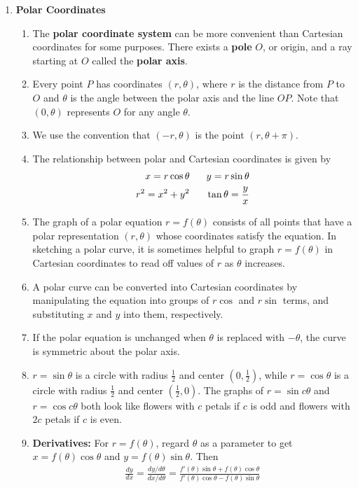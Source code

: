 \documentclass[10pt]{article}
\begin{document}
\begin{multicols}{2}
\begin{enumerate}
    \item \textbf{Polar Coordinates}
    \begin{enumerate}
        \item The \textbf{polar coordinate system} can be more convenient than Cartesian coordinates for some purposes. There exists a \textbf{pole} $O$, or origin, and a ray starting at $O$ called the \textbf{polar axis}. 
        \item Every point $P$ has coordinates $(r, \theta)$, where $r$ is the distance from $P$ to $O$ and $\theta$ is the angle between the polar axis and the line $OP$. Note that $(0, \theta)$ represents $O$ for any angle $\theta$. 
        \item We use the convention that $(-r, \theta)$ is the point $(r, \theta + \pi)$.
        \item The relationship between polar and Cartesian coordinates is given by
        \begin{align*}
            x = r \cos{\theta} \hspace{6mm} y = r \sin{\theta} \\
            r^2 = x^2 + y^2 \hspace{6mm} \tan{\theta} = \frac{y}{x}
        \end{align*}
        \item The graph of a polar equation $r = f(\theta)$ consists of all points that have a polar representation $(r, \theta)$ whose coordinates satisfy the equation. In sketching a polar curve, it is sometimes helpful to graph $r=f(\theta)$ in Cartesian coordinates to read off values of $r$ as $\theta$ increases.
        \item A polar curve can be converted into Cartesian coordinates by manipulating the equation into groups of $r\cos{}$ and $r\sin{}$ terms, and substituting $x$ and $y$ into them, respectively.
        \item If the polar equation is unchanged when $\theta$ is replaced with $-\theta$, the curve is symmetric about the polar axis.
        \item $r=\sin{\theta}$ is a circle with radius $\frac{1}{2}$ and center $(0,\frac{1}{2})$, while $r=\cos{\theta}$ is a circle with radius $\frac{1}{2}$ and center $(\frac{1}{2},0)$. The graphs of $r=\sin{c\theta}$ and $r=\cos{c\theta}$ both look like flowers with $c$ petals if $c$ is odd and flowers with $2c$ petals if $c$ is even.
        \item \textbf{Derivatives:} For $r=f(\theta)$, regard $\theta$ as a parameter to get $x = f(\theta)\cos{\theta}$ and $y = f(\theta)\sin{\theta}$. Then
        \begin{align*}
            \frac{dy}{dx} = \frac{dy / d\theta}{dx / d\theta} = \frac{f'(\theta)\sin{\theta} + f(\theta)\cos{\theta}}{f'(\theta)\cos{\theta} - f(\theta)\sin{\theta}}
        \end{align*}
        

\end{enumerate}
\end{enumerate}
\end{multicols}
\end{document}
